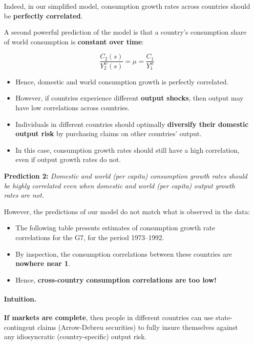 \documentclass[12pt]{article}
\begin{document}
Indeed, in our simplified model, consumption growth rates across countries should be \textbf{perfectly correlated}.

\bigskip

A second powerful prediction of the model is that a country’s consumption share of world consumption is \textbf{constant over time}:

\[
    \frac{C_2(s)}{Y_2^w(s)} = \mu = \frac{C_1}{Y_1^w}
\]

\begin{itemize}
    \item Hence, domestic and world consumption growth is perfectly correlated.
    \item However, if countries experience different \textbf{output shocks}, then output may have low correlations across countries.
    \item Individuals in different countries should optimally \textbf{diversify their domestic output risk} by purchasing claims on other countries’ output.
    \item In this case, consumption growth rates should still have a high correlation, even if output growth rates do not.
\end{itemize}

\textbf{Prediction 2:} \textit{Domestic and world (per capita) consumption growth rates should be highly correlated even when domestic and world (per capita) output growth rates are not.}

\bigskip

However, the predictions of our model do not match what is observed in the data:

\begin{itemize}
    \item The following table presents estimates of consumption growth rate correlations for the G7, for the period 1973--1992.
    \item By inspection, the consumption correlations between these countries are \textbf{nowhere near 1}.
    \item Hence, \textbf{cross-country consumption correlations are too low!}
\end{itemize}

\paragraph{Intuition.}
\textbf{If markets are complete}, then people in different countries can use state-contingent claims (Arrow-Debreu securities) to fully insure themselves against any idiosyncratic (country-specific) output risk.
\end{document}
